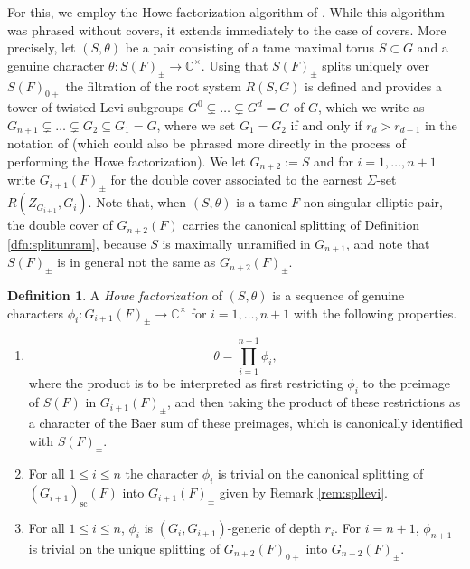 \documentclass{article}
\def\C{\mathbb{C}}
\theoremstyle{definition}
\newtheorem{dfn}[thm]{Definition}
\numberwithin{equation}{subsection}
\renewcommand{\-}{\hyp{}}
\begin{document}
For this, we employ the Howe factorization algorithm of \cite[\S3.6]{KalRSP}. While this algorithm was phrased without covers, it extends immediately to the case of covers. More precisely, let $(S,\theta)$ be a pair consisting of a tame maximal torus $S \subset G$ and a genuine character $\theta : S(F)_\pm \to \C^\times$. Using that $S(F)_\pm$ splits uniquely over $S(F)_{0+}$ the filtration \cite[(3.6.1)]{KalRSP} of the root system $R(S,G)$ is defined and provides a tower of twisted Levi subgroups $G^0 \subsetneq \dots \subsetneq G^d=G$ of $G$, which we write as $G_{n+1} \subsetneq \dots \subsetneq G_2 \subseteq G_1=G$, where we set $G_1=G_2$ if and only if $r_d>r_{d-1}$ in the notation of \cite[\S3.6]{KalRSP} (which could also be phrased more directly in the process of performing the Howe factorization). We let $G_{n+2}:=S$ and for $i=1,\dots,n+1$ write $G_{i+1}(F)_{\pm}$ for the double cover associated to the earnest $\Sigma$-set $R(Z_{G_{i+1}},G_i)$. Note that, when $(S,\theta)$ is a tame $F$-non-singular elliptic pair, the double cover of $G_{n+2}(F)$ carries the canonical splitting of Definition \ref{dfn:splitunram}, because $S$ is maximally unramified in $G_{n+1}$, and note that $S(F)_{\pm}$ is in general not the same as $G_{n+2}(F)_\pm$. 

\begin{dfn} \label{dfn:howe} A \emph{Howe factorization} of $(S,\theta)$ is a sequence of genuine characters $\phi_i : G_{i+1}(F)_\pm \to \C^\times$ for $i=1,\dots,n+1$ with the following properties. 
\begin{enumerate}
	\item \begin{equation} \label{eq:thetaprod} \theta = \prod_{i=1}^{n+1}\phi_i, \end{equation}
	where the product is to be interpreted as first restricting $\phi_i$ to the preimage of $S(F)$ in $G_{i+1}(F)_{\pm}$, and then taking the product of these restrictions as a character of the Baer sum of these preimages, which is canonically identified with $S(F)_\pm$.
	\item For all $1 \leq i \leq n$ the character $\phi_i$ is trivial on the canonical splitting of $(G_{i+1})_{\mathrm{sc}}(F)$ into $G_{i+1}(F)_\pm$ given by Remark \ref{rem:spllevi}. 
	\item For all $1 \leq i \leq n$, $\phi_i$ is $(G_i,G_{i+1})$-generic of depth $r_i$. 
For $i=n+1$, $\phi_{n+1}$ is trivial on the unique splitting of $G_{n+2}(F)_{0+}$ into $G_{n+2}(F)_\pm$.
\end{enumerate}
\end{dfn}
\end{document}
